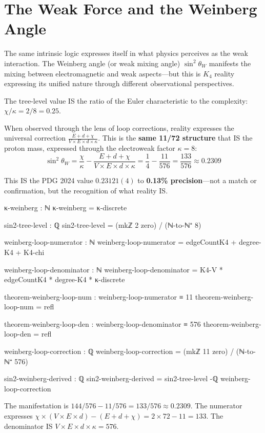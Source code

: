 \documentclass[11pt,a4paper]{book}
\begin{document}
\section{The Weak Force and the Weinberg Angle}

The same intrinsic logic expresses itself in what physics perceives as the weak interaction. The Weinberg angle (or weak mixing angle) $\sin^2 \theta_W$ manifests the mixing between electromagnetic and weak aspects—but this is $K_4$ reality expressing its unified nature through different observational perspectives.

The tree-level value IS the ratio of the Euler characteristic to the complexity: $\chi/\kappa = 2/8 = 0.25$.

When observed through the lens of loop corrections, reality expresses the universal correction $\frac{E + d + \chi}{V \times E \times d \times \kappa}$. This is the \textbf{same 11/72 structure} that IS the proton mass, expressed through the electroweak factor $\kappa = 8$:
\[
\sin^2\theta_W = \frac{\chi}{\kappa} - \frac{E + d + \chi}{V \times E \times d \times \kappa} = \frac{1}{4} - \frac{11}{576} = \frac{133}{576} \approx 0.2309
\]

This IS the PDG 2024 value $0.23121(4)$ to \textbf{0.13\% precision}—not a match or confirmation, but the recognition of what reality IS.

\begin{code}
κ-weinberg : ℕ  
κ-weinberg = κ-discrete

sin2-tree-level : ℚ
sin2-tree-level = (mkℤ 2 zero) / (ℕ-to-ℕ⁺ 8)

weinberg-loop-numerator : ℕ
weinberg-loop-numerator = edgeCountK4 + degree-K4 + K4-chi

weinberg-loop-denominator : ℕ
weinberg-loop-denominator = K4-V * edgeCountK4 * degree-K4 * κ-discrete

theorem-weinberg-loop-num : weinberg-loop-numerator ≡ 11
theorem-weinberg-loop-num = refl

theorem-weinberg-loop-den : weinberg-loop-denominator ≡ 576
theorem-weinberg-loop-den = refl

weinberg-loop-correction : ℚ
weinberg-loop-correction = (mkℤ 11 zero) / (ℕ-to-ℕ⁺ 576)

sin2-weinberg-derived : ℚ
sin2-weinberg-derived = sin2-tree-level -ℚ weinberg-loop-correction
\end{code}

The manifestation is $144/576 - 11/576 = 133/576 \approx 0.2309$.
The numerator expresses $\chi \times (V \times E \times d) - (E + d + \chi) = 2 \times 72 - 11 = 133$.
The denominator IS $V \times E \times d \times \kappa = 576$.
\end{document}
